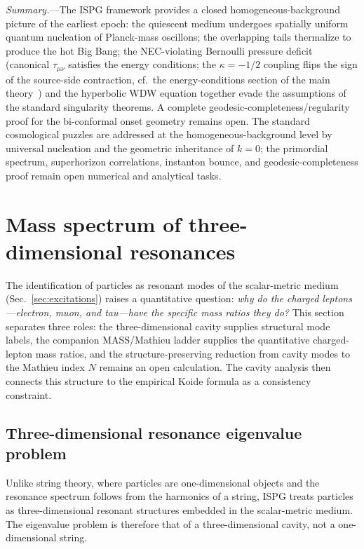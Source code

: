\documentclass[aps,prd,onecolumn,superscriptaddress,nofootinbib,showpacs,12pt,notitlepage]{revtex4-2}
\begin{document}
\textit{Summary.}---The ISPG framework provides a
closed homogeneous-background picture of the earliest
epoch: the
quiescent medium undergoes spatially uniform quantum
nucleation of Planck-mass oscillons; the overlapping
tails thermalize to produce the hot Big Bang; the
NEC-violating Bernoulli pressure deficit (canonical
$\tau_{\mu\nu}$ satisfies the energy conditions; the
$\kappa=-1/2$ coupling flips the sign of the source-side
contraction, cf.\ the energy-conditions section of the
main theory~\cite{Lotishvili2026}) and the hyperbolic WDW
equation together evade the assumptions of the standard
singularity theorems.  A complete
geodesic-completeness/regularity proof for the
bi-conformal onset geometry remains open.  The standard
cosmological puzzles are addressed at the
homogeneous-background level by universal nucleation and
the geometric inheritance of $k = 0$; the primordial
spectrum, superhorizon correlations, instanton bounce,
and geodesic-completeness proof remain open numerical
and analytical tasks.

\section{Mass spectrum of three-dimensional resonances}
\label{sec:mass_spectrum}

The identification of particles as resonant modes of the
scalar-metric medium (Sec.~\ref{sec:excitations}) raises a
quantitative question: \emph{why do the charged leptons---electron,
muon, and tau---have the specific mass ratios they do?}
This section separates three roles: the three-dimensional cavity
supplies structural mode labels, the companion MASS/Mathieu ladder
supplies the quantitative charged-lepton mass ratios, and the
structure-preserving reduction from cavity modes to the Mathieu
index $N$ remains an open calculation.  The cavity analysis then
connects this structure to the empirical Koide formula as a
consistency constraint.

\subsection{Three-dimensional resonance eigenvalue problem}
\label{sec:3d_resonance}

Unlike string theory, where particles are one-dimensional objects
and the resonance spectrum follows from the harmonics of a string,
ISPG treats particles as three-dimensional resonant structures
embedded in the scalar-metric medium.  The eigenvalue problem
is therefore that of a three-dimensional cavity, not a
one-dimensional string.
\end{document}
